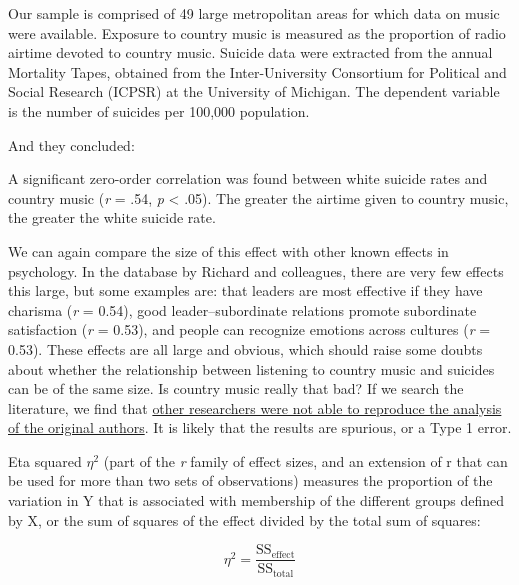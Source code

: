 \documentclass[
  oneside]{krantz}
\renewenvironment{quote}{\begin{VF}}{\end{VF}}
\begin{document}
\begin{quote}
Our sample is comprised of 49 large metropolitan areas for which data on music were available. Exposure to country music is measured as the proportion of radio airtime devoted to country music. Suicide data were extracted from the annual Mortality Tapes, obtained from the Inter-University Consortium for Political and Social Research (ICPSR) at the University of Michigan. The dependent variable is the number of suicides per 100,000 population.
\end{quote}

And they concluded:

\begin{quote}
A significant zero-order correlation was found between white suicide rates and country music (\emph{r} = .54, \emph{p} \textless{} .05). The greater the airtime given to country music, the greater the white suicide rate.
\end{quote}

We can again compare the size of this effect with other known effects in psychology. In the database by Richard and colleagues, there are very few effects this large, but some examples are: that leaders are most effective if they have charisma (\emph{r} = 0.54), good leader--subordinate relations promote subordinate satisfaction (\emph{r} = 0.53), and people can recognize emotions across cultures (\emph{r} = 0.53). These effects are all large and obvious, which should raise some doubts about whether the relationship between listening to country music and suicides can be of the same size. Is country music really that bad? If we search the literature, we find that \href{http://sf.oxfordjournals.org/content/74/1/327.short}{other researchers were not able to reproduce the analysis of the original authors}. It is likely that the results are spurious, or a Type 1 error.

Eta squared \(\eta^2\) (part of the \emph{r} family of effect sizes, and an extension of r that can be used for more than two sets of observations) measures the proportion of the variation in Y that is associated with membership of the different groups defined by X, or the sum of squares of the effect divided by the total sum of squares:

\[\eta^{2} = \frac{\text{SS}_{\text{effect}}}{\text{SS}_{\text{total}}}\]
\end{document}
